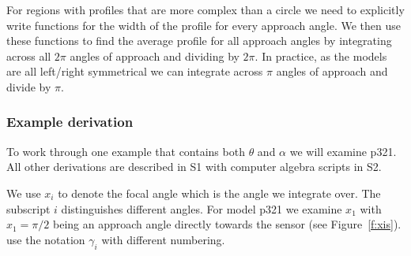 \documentclass[a4paper,10pt,reqno,oneside]{amsart}
\begin{document}
For regions with profiles that are more complex than a circle we need to explicitly write functions for the width of the profile for every approach angle. We then use these functions to find the average profile for all approach angles by integrating across all $2\pi$ angles of approach and dividing by $2\pi$. In practice, as the models are all left/right symmetrical we can integrate across $\pi$ angles of approach and divide by $\pi$.

\subsubsection{Example derivation}

To work through one example that contains both $\theta$ and $\alpha$ we will examine p321. All other derivations are described in S1 with computer algebra scripts in S2. 

We use $x_i$ to denote the focal angle which is the angle we integrate over. The subscript $i$ distinguishes different angles. For model p321 we examine $x_1$ with  $x_1 = \pi/2$ being an approach angle directly towards the sensor (see Figure~\ref{f:xis}). \cite{rowcliffe2008estimating} use the notation $\gamma_i$ with different numbering.
\end{document}
